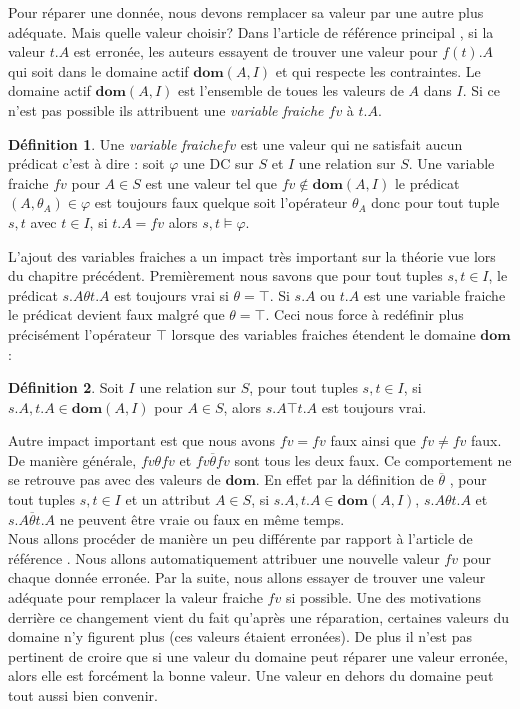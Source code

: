 \documentclass[letterpaper, 12pt]{report}
\theoremstyle{definition}
\newtheorem{mydef}{Définition}
\newcommand{\dom}{\mathbf{dom}}
\begin{document}
Pour réparer une donnée, nous devons remplacer sa valeur par une autre plus adéquate. Mais quelle valeur choisir? Dans l'article de référence principal \cite{main}, si la valeur $t.A$ est erronée, les auteurs essayent de trouver une valeur pour $f(t).A$ qui soit dans le domaine actif $\dom (A,I)$ et qui respecte les contraintes. Le domaine actif $\dom(A,I)$ est l'ensemble de toues les valeurs de $A$ dans $I$. Si ce n'est pas possible ils attribuent une \emph{variable fraiche $fv$} à $t.A$. \\

\begin{mydef}
Une \emph{variable fraiche}$fv$ est une valeur qui ne satisfait aucun prédicat c'est à dire : soit $\varphi$ une DC sur $S$ et $I$ une relation sur $S$. Une variable fraiche $fv$ pour $A \in S$ est une valeur tel que $fv \not\in \dom(A,I)$ le prédicat $(A,\theta_A) \in \varphi$ est toujours faux quelque soit l'opérateur $\theta_A$ donc pour tout tuple $s,t$ avec $t \in I$, si $t.A = fv$ alors ${s,t} \models \varphi$.
\end{mydef}

L'ajout des variables fraiches a un impact très important sur la théorie vue lors du chapitre précédent. Premièrement nous savons que pour tout tuples $s,t \in I$, le prédicat $s.A \theta t.A$ est toujours vrai si $\theta = \top$. Si $s.A$ ou $t.A$ est une variable fraiche le prédicat devient faux malgré que $\theta = \top$. Ceci nous force à redéfinir plus précisément l'opérateur $\top$ lorsque des variables fraiches étendent le domaine $\dom$:

\begin{mydef}
Soit $I$ une relation sur $S$, pour tout tuples $s,t \in I$, si $s.A,t.A \in \dom(A,I)$ pour $A \in S$, alors $s.A \top t.A$ est toujours vrai.
\end{mydef}

Autre impact important est que nous avons $fv = fv$ faux ainsi que $fv \neq fv$ faux. De manière générale, $fv \theta fv$ et $fv \overline{\theta} fv$ sont tous les deux faux. Ce comportement ne se retrouve pas avec des valeurs de $\dom$. En effet par la définition de $\overline{\theta}$ , pour tout tuples $s,t \in I$ et un attribut $A \in S$, si $s.A,t.A \in \dom(A,I)$, $s.A \theta t.A$ et $s.A \overline{\theta} t.A$ ne peuvent être vraie ou faux en même temps.\\

Nous allons procéder de manière un peu différente par rapport à l'article de référence \cite{main}. Nous allons automatiquement attribuer une nouvelle valeur $fv$ pour chaque donnée erronée. Par la suite, nous allons essayer de trouver une valeur adéquate pour remplacer la valeur fraiche $fv$ si possible. Une des motivations derrière ce changement vient du fait qu'après une réparation, certaines valeurs du domaine n'y figurent plus (ces valeurs étaient erronées). De plus il n'est pas pertinent de croire que si une valeur du domaine peut réparer une valeur erronée, alors elle est forcément la bonne valeur. Une valeur en dehors du domaine peut tout aussi bien convenir.\\
\end{document}
